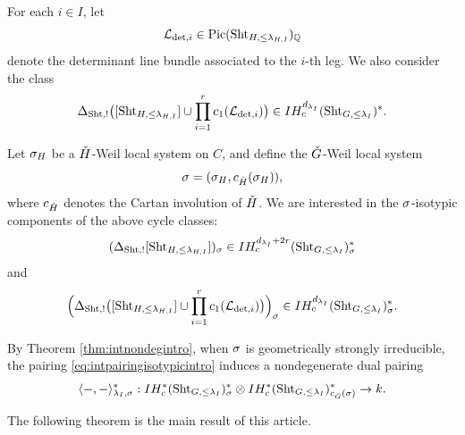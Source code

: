 \documentclass[reqno]{amsart}
\numberwithin{equation}{section}
\numberwithin{equation}{section}
\begin{document}
For each $i\in I$, let
\[
\mathcal{L}_{\det,i}\in \operatorname{Pic}(\operatorname{Sht}_{H,\leq\lambda_{H,I}})_{\mathbb{Q}}
\]
denote the determinant line bundle associated to the $i$-th leg. We also consider the class
\begin{equation}
    \Delta_{\operatorname{Sht},!}\bigl([\operatorname{Sht}_{H,\leq\lambda_{H,I}}]
    \cup
    \prod_{i=1}^r c_1(\mathcal{L}_{\det,i})\bigr)
    \in
    IH_c^{d_{\lambda_I}}(\operatorname{Sht}_{G,\leq\lambda_I})^*.
\end{equation}

Let $\sigma_H$ be a $\check{H}$-Weil local system on $C$, and define the $\check{G}$-Weil local system
\[
\sigma=(\sigma_H,c_{\check{H}}(\sigma_H)),
\]
where $c_{\check{H}}$ denotes the Cartan involution of $\check{H}$. We are interested in the $\sigma$-isotypic components of the above cycle classes:
\begin{equation}
    (\Delta_{\operatorname{Sht},!}[\operatorname{Sht}_{H,\leq\lambda_{H,I}}])_{\sigma}
    \in
    IH_c^{d_{\lambda_I}+2r}(\operatorname{Sht}_{G,\leq\lambda_I})_{\sigma}^*
\end{equation}
and
\begin{equation}
    \Bigl(
    \Delta_{\operatorname{Sht},!}\bigl([\operatorname{Sht}_{H,\leq\lambda_{H,I}}]
    \cup
    \prod_{i=1}^r c_1(\mathcal{L}_{\det,i})\bigr)
    \Bigr)_{\sigma}
    \in
    IH_c^{d_{\lambda_I}}(\operatorname{Sht}_{G,\leq\lambda_I})_{\sigma}^*.
\end{equation}

By Theorem \ref{thm:intnondegintro}, when $\sigma$ is geometrically strongly irreducible, the pairing \eqref{eq:intpairingisotypicintro} induces a nondegenerate dual pairing
\begin{equation}\label{eq:intpairingisotypicintrodual}
    \langle -, -\rangle_{\lambda_I,\sigma}^* :
    IH_c^*(\operatorname{Sht}_{G,\leq\lambda_I})_{\sigma}^*
    \otimes
    IH_c^*(\operatorname{Sht}_{G,\leq\lambda_I})_{c_{\check{G}}(\sigma)}^*
    \to k.
\end{equation}

The following theorem is the main result of this article.
\end{document}
